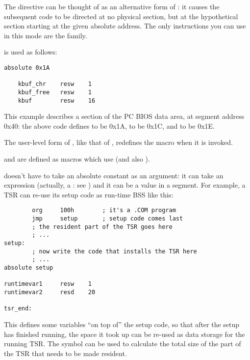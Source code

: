 
The  directive can be thought of as an alternative form
of : it causes the subsequent code to be directed at no
physical section, but at the hypothetical section starting at the
given absolute address. The only instructions you can use in this
mode are the  family.

 is used as follows:

\begin{lstlisting}
absolute 0x1A

    kbuf_chr    resw    1
    kbuf_free   resw    1
    kbuf        resw    16
\end{lstlisting}

This example describes a section of the PC BIOS data area, at
segment address 0x40: the above code defines  to be
0x1A,  to be 0x1C, and  to be 0x1E.

The user-level form of , like that of ,
redefines the  macro when it is invoked.

 and  are defined as macros
which use  (and also ).

 doesn't have to take an absolute constant as an
argument: it can take an expression (actually, a : see ) and it can be a value in a segment.
For example, a TSR can re-use its setup code as run-time BSS like this:

\begin{lstlisting}
        org     100h        ; it's a .COM program
        jmp     setup       ; setup code comes last
        ; the resident part of the TSR goes here
        ; ...
setup:
        ; now write the code that installs the TSR here
        ; ...
absolute setup

runtimevar1     resw    1
runtimevar2     resd    20

tsr_end:
\end{lstlisting}

This defines some variables ``on top of'' the setup code, so that
after the setup has finished running, the space it took up can be
re-used as data storage for the running TSR. The symbol
 can be used to calculate the total size of
the part of the TSR that needs to be made resident.

